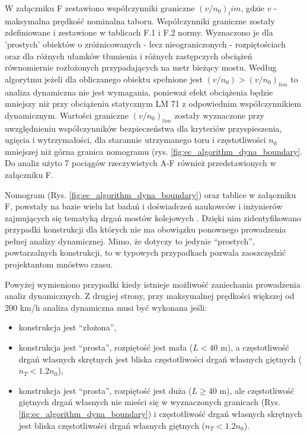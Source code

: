 W załączniku F zestawiono współczynniki graniczne $(v/n_0)_lim$, gdzie $v$ - maksymalna prędkość nominalna taboru. Współczynniki graniczne zostały zdefiniowane i zestawione w tablicach F.1 i F.2 normy. Wyznaczono je dla 'prostych' obiektów o zróżnicowanych - lecz nieograniczonych - rozpiętościach oraz dla różnych ułamków tłumienia i różnych zastępczych obciążeń równomiernie rozłożonych przypadających na metr bieżący mostu. Według algorytmu jeżeli dla obliczanego obiektu spełnione jest $(v/n_0)>(v/n_0)_{lim}$ to analiza dynamiczna nie jest wymagania, ponieważ efekt obciążenia będzie mniejszy niż przy obciążeniu statycznym LM 71 z odpowiednim współczynnikiem dynamicznym. Wartości graniczne $(v/n_0)_{lim}$ zostały wyznaczone przy uwzględnieniu współczynników bezpieczeństwa dla kryteriów przyspieszenia, ugięcia i wytrzymałości, dla starannie utrzymanego toru i częstotliwości $n_0$ mniejszej niż górna granica nomogramu (rys. \ref{fig:ec_algorithm_dyna_boundary}. Do analiz użyto 7 pociągów rzeczywistych A-F również przedstawionych w załączniku F. 

Nomogram (Rys. \ref{fig:ec_algorithm_dyna_boundary}) oraz tablice w załączniku F, powstały na bazie wielu lat badań i doświadczeń naukowców i inżynierów zajmujących się tematyką drgań mostów kolejowych \parencite{UnionInternationaleDesCheminsDeFer2009,ERRI1998}. Dzięki nim zidentyfikowano przypadki konstrukcji dla których nie ma obowiązku ponownego prowadzenia pełnej analizy dynamicznej. Mimo, że dotyczy to jedynie \enquote{prostych}, powtarzalnych konstrukcji, to w typowych przypadkach pozwala zaoszczędzić projektantom mnóstwo czasu. 


Powyżej wymieniono przypadki kiedy istnieje możliwość zaniechania prowadzenia analiz dynamicznych. Z drugiej strony, przy maksymalnej prędkości większej od 200 km/h analiza dynamiczna musi być wykonana jeśli:
\begin{itemize}
	\item konstrukcja jest \enquote{złożona},
	\item konstrukcja jest \enquote{prosta}, rozpiętość jest mała ($L < 40$ m), a częstotliwość drgań własnych skrętnych jest bliska częstotliwości drgań własnych giętnych ($n_T<1.2n_0$),
	\item konstrukcja jest \enquote{prosta}, rozpiętość jest duża ($L \ge 40$ m), ale częstotliwość giętnych drgań własnych nie mieści się w wyznaczonych granicach (Rys. \ref{fig:ec_algorithm_dyna_boundary}) i częstotliwość drgań własnych skrętnych jest bliska częstotliwości drgań własnych giętnych ($n_T<1.2n_0$).
\end{itemize}




